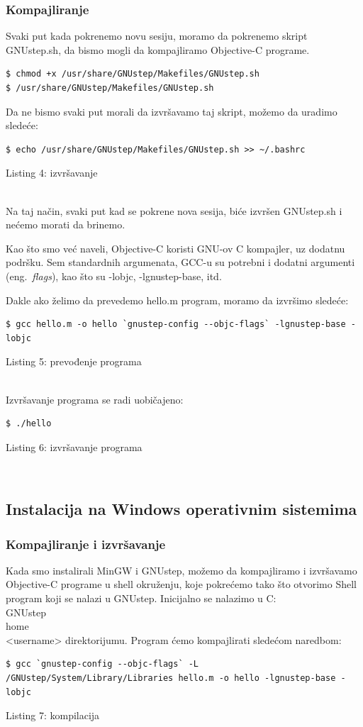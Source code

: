 \documentclass[a4paper]{article}
\begin{document}
{{\subsubsection{Kompajliranje}
Svaki put kada pokrenemo novu sesiju, moramo da pokrenemo skript GNUstep.sh, da bismo mogli da kompajliramo Objective-C programe.
\begin{lstlisting}[frame=single]
$ chmod +x /usr/share/GNUstep/Makefiles/GNUstep.sh
$ /usr/share/GNUstep/Makefiles/GNUstep.sh
\end{lstlisting}
Da ne bismo svaki put morali da izvršavamo taj skript, možemo da uradimo sledeće:
\begin{lstlisting}[frame=single]
$ echo /usr/share/GNUstep/Makefiles/GNUstep.sh >> ~/.bashrc
\end{lstlisting}
\caption{Listing 4: izvršavanje} \\

Na taj način, svaki put kad se pokrene nova sesija, biće izvršen GNUstep.sh i nećemo morati da brinemo.

Kao što smo već naveli, Objective-C koristi GNU-ov C kompajler, uz dodatnu
podršku.
Sem standardnih argumenata, GCC-u su potrebni i dodatni argumenti (eng.~{\em flags}), kao što su -lobjc, -lgnustep-base, itd.

Dakle ako želimo da prevedemo hello.m program, moramo da izvršimo sledeće:
\begin{lstlisting}[frame=single]
$ gcc hello.m -o hello `gnustep-config --objc-flags` -lgnustep-base -lobjc
\end{lstlisting}
\caption{Listing 5: prevođenje programa} \\

Izvršavanje programa se radi uobičajeno:
\begin{lstlisting}[frame=single]
$ ./hello
\end{lstlisting}
\caption{Listing 6: izvršavanje programa} \\

\subsection{Instalacija na Windows operativnim sistemima}
\subsubsection{Kompajliranje i izvršavanje}
Kada smo instalirali MinGW i GNUstep, možemo da kompajliramo i izvršavamo Objective-C programe u shell okruženju, koje pokrećemo tako što otvorimo Shell program koji se nalazi u GNUstep.
Inicijalno se nalazimo u C:\\GNUstep\\home\\<username> direktorijumu.
Program ćemo kompajlirati sledećom naredbom:
\begin{lstlisting}[frame=single]
$ gcc `gnustep-config --objc-flags` -L /GNUstep/System/Library/Libraries hello.m -o hello -lgnustep-base -lobjc
\end{lstlisting}
\caption{Listing 7: kompilacija} \\

}}
\end{document}
